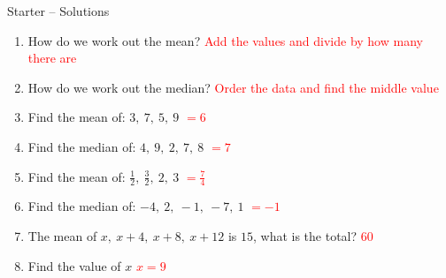 \documentclass{beamer}
\begin{document}
\begin{frame}{Starter -- Solutions}
\vspace{-0.8em}

\footnotesize
\begin{enumerate}\itemsep2pt
  \item How do we work out the mean?  
        \textcolor{red}{Add the values and divide by how many there are}
  \item How do we work out the median?  
        \textcolor{red}{Order the data and find the middle value}
  \item Find the mean of: $3,\ 7,\ 5,\ 9$  
        \textcolor{red}{$=6$}
  \item Find the median of: $4,\ 9,\ 2,\ 7,\ 8$  
        \textcolor{red}{$=7$}
  \item Find the mean of: $\frac{1}{2},\ \frac{3}{2},\ 2,\ 3$  
        \textcolor{red}{$=\frac{7}{4}$}
  \item Find the median of: $-4,\ 2,\ -1,\ -7,\ 1$  
        \textcolor{red}{$=-1$}
  \item The mean of $x,\ x+4,\ x+8,\ x+12$ is $15$, what is the total?  
        \textcolor{red}{$60$}
  \item Find the value of $x$  
        \textcolor{red}{$x=9$}
\end{enumerate}
\end{frame}
\end{document}
